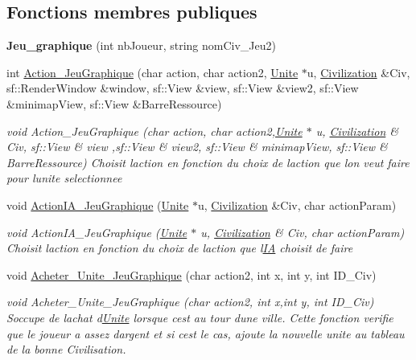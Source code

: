 \subsection*{Fonctions membres publiques}
\begin{DoxyCompactItemize}
\item 
\mbox{\label{classJeu__graphique_a9c8671b4f9b7c0884a1fc4d006b1588f}} 
{\bfseries Jeu\+\_\+graphique} (int nb\+Joueur, string nom\+Civ\+\_\+\+Jeu2)
\item 
int \hyperlink{classJeu__graphique_a259e8ddfadc2d86563c52fde722e9de9}{Action\+\_\+\+Jeu\+Graphique} (char action, char action2, \hyperlink{classUnite}{Unite} $\ast$u, \hyperlink{classCivilization}{Civilization} \&Civ, sf\+::\+Render\+Window \&window, sf\+::\+View \&view, sf\+::\+View \&view2, sf\+::\+View \&minimap\+View, sf\+::\+View \&Barre\+Ressource)
\begin{DoxyCompactList}\small\item\em void Action\+\_\+\+Jeu\+Graphique (char action, char action2,\hyperlink{classUnite}{Unite} $\ast$ u, \hyperlink{classCivilization}{Civilization} \& Civ, sf\+::\+View \& view ,sf\+::\+View \& view2, sf\+::\+View \& minimap\+View, sf\+::\+View \& Barre\+Ressource) Choisit l\textquotesingle{}action en fonction du choix de l\textquotesingle{}action que l\textquotesingle{}on veut faire pour l\textquotesingle{}unite selectionnee \end{DoxyCompactList}\item 
void \hyperlink{classJeu__graphique_aaa032d88ed8052f9a47fe83dd8e100c2}{Action\+I\+A\+\_\+\+Jeu\+Graphique} (\hyperlink{classUnite}{Unite} $\ast$u, \hyperlink{classCivilization}{Civilization} \&Civ, char action\+Param)
\begin{DoxyCompactList}\small\item\em void Action\+I\+A\+\_\+\+Jeu\+Graphique (\hyperlink{classUnite}{Unite} $\ast$ u, \hyperlink{classCivilization}{Civilization} \& Civ, char action\+Param) Choisit l\textquotesingle{}action en fonction du choix de l\textquotesingle{}action que l\textquotesingle{}\hyperlink{classIA}{IA} choisit de faire \end{DoxyCompactList}\item 
void \hyperlink{classJeu__graphique_a1e3d0828a10fafe5d1e667dba8f4ef38}{Acheter\+\_\+\+Unite\+\_\+\+Jeu\+Graphique} (char action2, int x, int y, int I\+D\+\_\+\+Civ)
\begin{DoxyCompactList}\small\item\em void Acheter\+\_\+\+Unite\+\_\+\+Jeu\+Graphique (char action2, int x,int y, int I\+D\+\_\+\+Civ) S\textquotesingle{}occupe de l\textquotesingle{}achat d\textquotesingle{}\hyperlink{classUnite}{Unite} lorsque c\textquotesingle{}est au tour d\textquotesingle{}une ville. Cette fonction verifie que le joueur a assez d\textquotesingle{}argent et si c\textquotesingle{}est le cas, ajoute la nouvelle unite au tableau de la bonne Civilisation. \end{DoxyCompactList}\item 

\end{DoxyCompactItemize}
